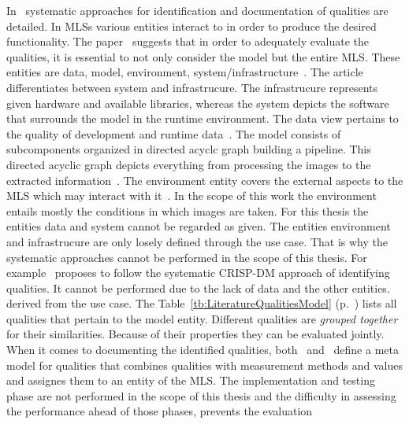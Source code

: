 In~\cite{nakamichi_requirements-driven_2020,siebert_construction_2021} systematic approaches for
identification and documentation of qualities are detailed.
In \acp{MLS} various entities interact to in order to produce the desired functionality.
The paper~\cite{nakamichi_requirements-driven_2020} suggests that in order to adequately evaluate
the qualities, it is essential to not only consider the model but the entire \ac{MLS}.
These entities are data, model, environment,
system/infrastructure~\citep{nakamichi_requirements-driven_2020, siebert_construction_2021}.
The article~\cite{siebert_construction_2021} differentiates between system and infrastrucure.
The infrastrucure represents given hardware and available libraries, whereas the system depicts
the software that surrounds the model in the runtime environment.
The data view pertains to the quality of development and runtime
data~\citep{siebert_construction_2021}.
The model consists of subcomponents organized in directed acyclc graph building a
pipeline.
This directed acyclic graph depicts everything from processing the images to the extracted
information~\citep{siebert_construction_2021}.
The environment entity covers the external aspects to the \ac{MLS} which may interact with
it~\citep{siebert_construction_2021}.
In the scope of this work the environment entails mostly the conditions in which images are taken.
For this thesis the entities data and system cannot be regarded as given.
The entities environment and infrastrucure are only losely defined through the use case.
That is why the systematic approaches cannot be performed in the scope of this thesis.
For example~\cite{siebert_construction_2021} proposes to follow the systematic CRISP-DM approach of
identifying qualities.
It cannot be performed due to the lack of data and the other entities.
derived from the use case.
The Table~\ref{tb:LiteratureQualitiesModel} (p.~\pageref{tb:LiteratureQualitiesModel}) lists all
qualities that pertain to the model entity.
Different qualities are \textit{grouped together} for their similarities.
Because of their properties they can be evaluated jointly.
When it comes to documenting the identified qualities,
both~\cite{nakamichi_requirements-driven_2020} and~\cite{siebert_construction_2021} define a meta
model for qualities that combines qualities with
measurement methods and values and assignes them to an entity of the \ac{MLS}.
The implementation and testing phase are not performed in the scope of this thesis and the
difficulty in assessing the performance ahead of those phases, prevents the evaluation
